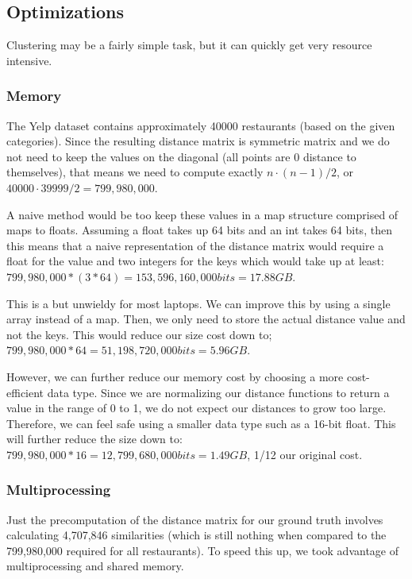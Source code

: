 \documentclass{article}
\begin{document}
\subsection{Optimizations}
Clustering may be a fairly simple task, but it can quickly get very resource intensive.

\subsubsection{Memory}
The Yelp dataset contains approximately 40000 restaurants (based on the given categories).
Since the resulting distance matrix is symmetric matrix and we do not need to keep the values on the diagonal (all points are 0 distance to themselves), that means we need to compute exactly $ n \cdot (n - 1) / 2 $, or $ 40000 \cdot 39999 / 2  = 799,980,000 $.

A naive method would be too keep these values in a map structure comprised of maps to floats.
Assuming a float takes up 64 bits and an int takes 64 bits,
then this means that a naive representation of the distance matrix would require a float for the value and two integers for the keys which would take up at least:
$ 799,980,000 * (3 * 64) = 153,596,160,000 bits = 17.88 GB $.

This is a but unwieldy for most laptops.
We can improve this by using a single array instead of a map.
Then, we only need to store the actual distance value and not the keys.
This would reduce our size cost down to;
$ 799,980,000 * 64 = 51,198,720,000 bits = 5.96 GB $.

However, we can further reduce our memory cost by choosing a more cost-efficient data type.
Since we are normalizing our distance functions to return a value in the range of 0 to 1, we do not expect our distances to grow too large.
Therefore, we can feel safe using a smaller data type such as a 16-bit float.
This will further reduce the size down to:
$ 799,980,000 * 16 = 12,799,680,000 bits = 1.49 GB $, 1/12 our original cost.

\subsubsection{Multiprocessing}
Just the precomputation of the distance matrix for our ground truth involves calculating 4,707,846 similarities (which is still nothing when compared to the 799,980,000 required for all restaurants).
To speed this up, we took advantage of multiprocessing and shared memory.
\end{document}
